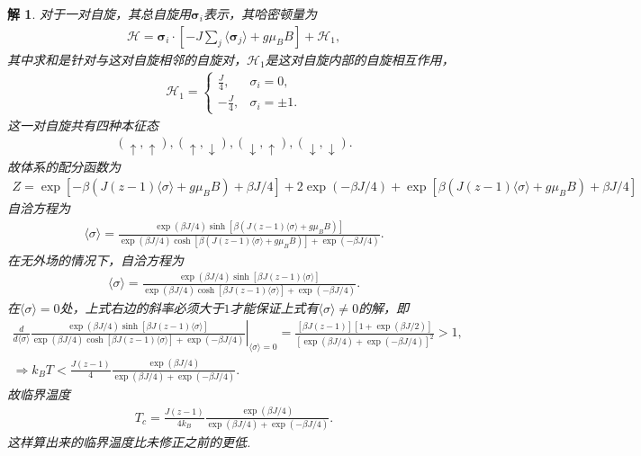 \documentclass[UTF8,10pt,a4paper]{article}
\theoremstyle{Problem}
\theoremstyle{Solution}
\newtheorem*{sol}{解}
\begin{document}
\begin{sol}
    对于一对自旋，其总自旋用$\bm{\sigma}_i$表示，其哈密顿量为
    \begin{align}
        \mathcal{H}=\bm{\sigma}_i\cdot\left[-J\sum_j\langle\bm{\sigma}_j\rangle+g\mu_BB\right]+\mathcal{H}_1,
    \end{align}
    其中求和是针对与这对自旋相邻的自旋对，$\mathcal{H}_1$是这对自旋内部的自旋相互作用，
    \begin{align}
        \mathcal{H}_1=\left\{\begin{array}{ll}
            \frac{J}{4},&\sigma_i=0,\\
            -\frac{J}{4},&\sigma_i=\pm 1.
        \end{array}\right.
    \end{align}
    这一对自旋共有四种本征态
    \begin{align}
        (\uparrow,\uparrow),(\uparrow,\downarrow),(\downarrow,\uparrow),(\downarrow,\downarrow).
    \end{align}
    故体系的配分函数为
    \begin{align}
        Z=\exp[-\beta(J(z-1)\langle\sigma\rangle+g\mu_BB)+\beta J/4]+2\exp(-\beta J/4)+\exp[\beta(J(z-1)\langle\sigma\rangle+g\mu_BB)+\beta J/4]
    \end{align}
    自洽方程为
    \begin{align}
        \langle\sigma\rangle=\frac{\exp(\beta J/4)\sinh[\beta(J(z-1)\langle\sigma\rangle+g\mu_BB)]}{\exp(\beta J/4)\cosh[\beta(J(z-1)\langle\sigma\rangle+g\mu_BB)]+\exp(-\beta J/4)}.
    \end{align}
    在无外场的情况下，自洽方程为
    \begin{align}
        \langle\sigma\rangle=\frac{\exp(\beta J/4)\sinh[\beta J(z-1)\langle\sigma\rangle]}{\exp(\beta J/4)\cosh[\beta J(z-1)\langle\sigma\rangle]+\exp(-\beta J/4)}.
    \end{align}
    在$\langle\sigma\rangle=0$处，上式右边的斜率必须大于$1$才能保证上式有$\langle\sigma\rangle\neq 0$的解，即
    \begin{gather}
        \left.\frac{d}{d\langle\sigma\rangle}\frac{\exp(\beta J/4)\sinh[\beta J(z-1)\langle\sigma\rangle]}{\exp(\beta J/4)\cosh[\beta J(z-1)\langle\sigma\rangle]+\exp(-\beta J/4)}\right\rvert_{\langle\sigma\rangle=0}=\frac{[\beta J(z-1)][1+\exp(\beta J/2)]}{[\exp(\beta J/4)+\exp(-\beta J/4)]^2}>1,\\
        \Longrightarrow k_BT<\frac{J(z-1)}{4}\frac{\exp(\beta J/4)}{\exp(\beta J/4)+\exp(-\beta J/4)}.
    \end{gather}
    故临界温度
    \begin{align}
    T_c=\frac{J(z-1)}{4k_B}\frac{\exp(\beta J/4)}{\exp(\beta J/4)+\exp(-\beta J/4)}.
    \end{align}
    这样算出来的临界温度比未修正之前的更低.
\end{sol}
\end{document}
